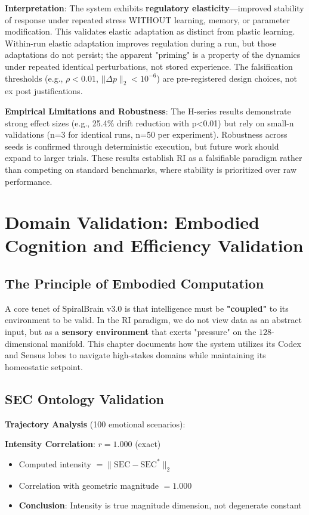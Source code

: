\documentclass[12pt,a4paper]{report}
\newcommand{\subtwo}{_2}
\begin{document}
\pagebreak

\textbf{Interpretation}: The system exhibits \textbf{regulatory elasticity}—improved stability of response under repeated stress WITHOUT learning, memory, or parameter modification. This validates elastic adaptation as distinct from plastic learning. Within-run elastic adaptation improves regulation during a run, but those adaptations do not persist; the apparent "priming" is a property of the dynamics under repeated identical perturbations, not stored experience. The falsification thresholds (e.g., $\rho < 0.01$, $||\Delta p\|_2 < 10^{-6}$) are pre-registered design choices, not ex post justifications.

\textbf{Empirical Limitations and Robustness}: The H-series results demonstrate strong effect sizes (e.g., 25.4\% drift reduction with p<0.01) but rely on small-n validations (n=3 for identical runs, n=50 per experiment). Robustness across seeds is confirmed through deterministic execution, but future work should expand to larger trials. These results establish RI as a falsifiable paradigm rather than competing on standard benchmarks, where stability is prioritized over raw performance.

\chapter{Domain Validation: Embodied Cognition and Efficiency Validation}

\section{The Principle of Embodied Computation}

A core tenet of SpiralBrain v3.0 is that intelligence must be \textbf{"coupled"} to its environment to be valid. In the RI paradigm, we do not view data as an abstract input, but as a \textbf{sensory environment} that exerts "pressure" on the $128$-dimensional manifold. This chapter documents how the system utilizes its Codex and Sensus lobes to navigate high-stakes domains while maintaining its homeostatic setpoint.

\section{SEC Ontology Validation}

\textbf{Trajectory Analysis} (100 emotional scenarios):

\textbf{Intensity Correlation}: $r = 1.000$ (exact)
\begin{itemize}
    \item Computed intensity $= \lVert \text{SEC} - \text{SEC}^* \rVert\subtwo$
    \item Correlation with geometric magnitude $= 1.000$
    \item \textbf{Conclusion}: Intensity is true magnitude dimension, not degenerate constant
\end{itemize}
\end{document}
